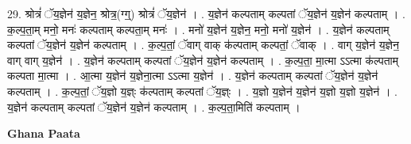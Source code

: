 \documentclass[17pt]{extarticle}
\begin{document}
29. श्रोत्रं॑ ॅय॒ज्ञेन॑ य॒ज्ञेन॒ श्रोत्र॒(ग्ग्॒) श्रोत्रं॑ ॅय॒ज्ञेन॑ । . य॒ज्ञेन॑ कल्पताम् कल्पतां ॅय॒ज्ञेन॑ य॒ज्ञेन॑ कल्पताम् । . क॒ल्प॒ता॒म् मनो॒ मनः॑ कल्पताम् कल्पता॒म् मनः॑ । . मनो॑ य॒ज्ञेन॑ य॒ज्ञेन॒ मनो॒ मनो॑ य॒ज्ञेन॑ । . य॒ज्ञेन॑ कल्पताम् कल्पतां ॅय॒ज्ञेन॑ य॒ज्ञेन॑ कल्पताम् । . क॒ल्प॒तां॒ ॅवाग् वाक् क॑ल्पताम् कल्पतां॒ ॅवाक् । . वाग् य॒ज्ञेन॑ य॒ज्ञेन॒ वाग् वाग् य॒ज्ञेन॑ । . य॒ज्ञेन॑ कल्पताम् कल्पतां ॅय॒ज्ञेन॑ य॒ज्ञेन॑ कल्पताम् । . क॒ल्प॒ता॒ मा॒त्मा ऽऽत्मा क॑ल्पताम् कल्पता मा॒त्मा । . आ॒त्मा य॒ज्ञेन॑ य॒ज्ञेना॒त्मा ऽऽत्मा य॒ज्ञेन॑ । . य॒ज्ञेन॑ कल्पताम् कल्पतां ॅय॒ज्ञेन॑ य॒ज्ञेन॑ कल्पताम् । . क॒ल्प॒तां॒ ॅय॒ज्ञो य॒ज्ञ्ः क॑ल्पताम् कल्पतां ॅय॒ज्ञ्ः । . य॒ज्ञो य॒ज्ञेन॑ य॒ज्ञेन॑ य॒ज्ञो य॒ज्ञो य॒ज्ञेन॑ । . य॒ज्ञेन॑ कल्पताम् कल्पतां ॅय॒ज्ञेन॑ य॒ज्ञेन॑ कल्पताम् । . क॒ल्प॒ता॒मिति॑ कल्पताम् । \newline

\textbf{Ghana Paata } \newline
\end{document}
